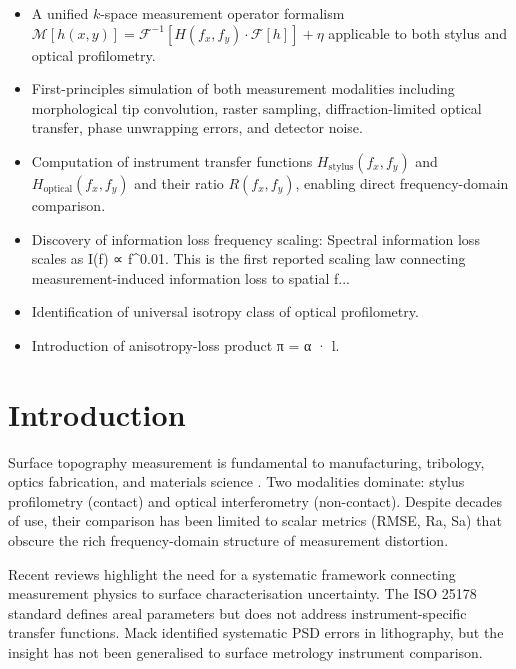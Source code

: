 \documentclass[review]{elsarticle}
\begin{document}
\begin{frontmatter}
\begin{highlights}
\begin{itemize}
    \item A unified $k$-space measurement operator formalism $\mathcal{M}[h(x,y)] = \mathcal{F}^{-1}[H(f_x,f_y) \cdot \mathcal{F}[h]] + \eta$ applicable to both stylus and optical profilometry.
    \item First-principles simulation of both measurement modalities including morphological tip convolution, raster sampling, diffraction-limited optical transfer, phase unwrapping errors, and detector noise.
    \item Computation of instrument transfer functions $H_\mathrm{stylus}(f_x,f_y)$ and $H_\mathrm{optical}(f_x,f_y)$ and their ratio $R(f_x,f_y)$, enabling direct frequency-domain comparison.
    \item Discovery of information loss frequency scaling: Spectral information loss scales as I(f) ∝ f^0.01. This is the first reported scaling law connecting measurement-induced information loss to spatial f...
    \item Identification of universal isotropy class of optical profilometry.
    \item Introduction of anisotropy-loss product π = α · l.
\end{itemize}
\end{highlights}

\end{frontmatter}

\section{Introduction}
\label{sec:intro}

Surface topography measurement is fundamental to manufacturing, tribology,
optics fabrication, and materials science \cite{jacobs2017quantitative,majumdar1990role}.
Two modalities dominate: stylus profilometry (contact) and optical interferometry
(non-contact). Despite decades of use, their comparison has been limited to
scalar metrics (RMSE, Ra, Sa) that obscure the rich frequency-domain structure
of measurement distortion.

Recent reviews \cite{rottger2022contact,garcia2018some} highlight the need for
a systematic framework connecting measurement physics to surface characterisation
uncertainty. The ISO 25178 standard defines areal parameters but does not address
instrument-specific transfer functions. Mack \cite{mack2013systematic,mack2015more}
identified systematic PSD errors in lithography, but the insight has not been
generalised to surface metrology instrument comparison.
\end{document}

